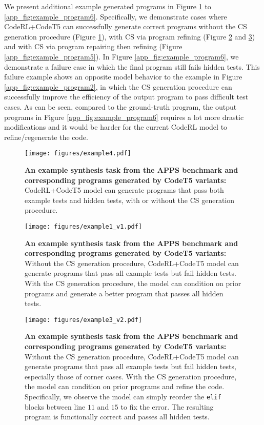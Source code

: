 \documentclass{article}
\begin{document}
We present additional example generated programs in Figure \ref{app_fig:example_program4} to \ref{app_fig:example_program6}.
Specifically, we demonstrate cases where CodeRL+CodeT5 can successfully generate correct programs without the CS generation procedure (Figure \ref{app_fig:example_program4}), with CS via program refining (Figure \ref{app_fig:example_program1} and \ref{app_fig:example_program3}) and with CS via program repairing then refining (Figure \ref{app_fig:example_program5}).
In Figure \ref{app_fig:example_program6}, we demonstrate a failure case in which the final program still fails hidden tests. 
This failure example shows an opposite model behavior to the example in Figure \ref{app_fig:example_program2}, in which the CS generation procedure can successfully improve the efficiency of the output program to pass difficult test cases. 
As can be seen, compared to the ground-truth program, the output programs in Figure \ref{app_fig:example_program6} requires a lot more drastic modifications and it would be harder for the current CodeRL model to refine/regenerate the code. 

\begin{figure}[htbp]
	\centering
	\resizebox{1.0\textwidth}{!} {
	\texttt{[image: figures/example4.pdf]}
	}
	\caption{
	\textbf{An example synthesis task from the APPS benchmark and corresponding programs generated by CodeT5 variants:}
	CodeRL+CodeT5 model can generate programs that pass both example tests and hidden tests, with or without the CS generation procedure. 
	}
	\label{app_fig:example_program4}
\end{figure}

\begin{figure}[htbp]
	\centering
	\resizebox{1.0\textwidth}{!} {
	\texttt{[image: figures/example1\_v1.pdf]}
	}
	\caption{
	\textbf{An example synthesis task from the APPS benchmark and corresponding programs generated by CodeT5 variants:}
	Without the CS generation procedure, CodeRL+CodeT5 model can generate programs that pass all example tests but fail hidden tests. 
	With the CS generation procedure, the model can condition on prior programs and generate a better program that passes all hidden tests. 
	}
	\label{app_fig:example_program1}
\end{figure}

\begin{figure}[htbp]
	\centering
	\resizebox{1.0\textwidth}{!} {
	\texttt{[image: figures/example3\_v2.pdf]}
	}
	\caption{
	\textbf{An example synthesis task from the APPS benchmark and corresponding programs generated by CodeT5 variants:}
	Without the CS generation procedure, CodeRL+CodeT5 model can generate programs that pass all example tests but fail hidden tests, especially those of corner cases. 
	With the CS generation procedure, the model can condition on prior programs and refine the code. 
	Specifically, we observe the model can simply reorder the \texttt{elif} blocks between line $11$ and $15$ to fix the error.
	The resulting program is functionally correct and passes all hidden tests. 
	}
	\label{app_fig:example_program3}
\end{figure}
\end{document}
